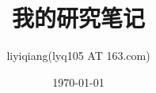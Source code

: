 \documentclass[UTF8]{ctexart}
\title{我的研究笔记}
\author{liyiqiang(lyq105 AT 163.com)}
\date{\today}
\begin{document}
\maketitle
\tableofcontents
\newpage
\bibliographyunit[\section]  %
\end{document}
